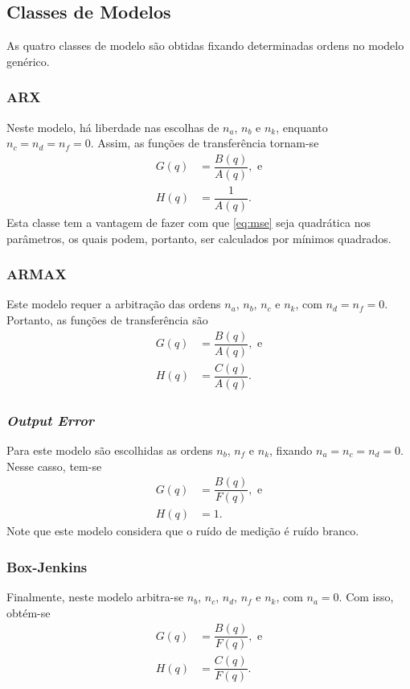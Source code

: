 \documentclass{ppgeesa}
\begin{document}
\subsection{Classes de Modelos}
As quatro classes de modelo são obtidas fixando determinadas ordens no modelo genérico.

\subsubsection{ARX}
Neste modelo, há liberdade nas escolhas de $n_a$, $n_b$ e $n_k$, enquanto $n_c = n_d = n_f = 0$.
Assim, as funções de transferência tornam-se
\begin{align}
  G(q) &= \dfrac{B(q)}{A(q)}
  , \text{ e}
  \\
  H(q) &= \dfrac{1}{A(q)}
  .
\end{align}
Esta classe tem a vantagem de fazer com que \eqref{eq:mse} seja quadrática nos parâmetros, os quais podem, portanto, ser calculados por mínimos quadrados.

\subsubsection{ARMAX}
Este modelo requer a arbitração das ordens $n_a$, $n_b$, $n_c$ e $n_k$, com $n_d = n_f = 0$.
Portanto, as funções de transferência são
\begin{align}
  G(q) &= \dfrac{B(q)}{A(q)}
  , \text{ e}
  \\
  H(q) &= \dfrac{C(q)}{A(q)}
  .
\end{align}

\subsubsection{\emph{Output Error}}
Para este modelo são escolhidas as ordens $n_b$, $n_f$ e $n_k$, fixando $n_a = n_c = n_d = 0$.
Nesse casso, tem-se
\begin{align}
  G(q) &= \dfrac{B(q)}{F(q)}
  , \text{ e}
  \\
  H(q) &= 1
  .
\end{align}
Note que este modelo considera que o ruído de medição é ruído branco. %

\subsubsection{Box-Jenkins}
Finalmente, neste modelo arbitra-se $n_b$, $n_c$, $n_d$, $n_f$ e $n_k$, com $n_a = 0$.
Com isso, obtém-se
\begin{align}
  G(q) &= \dfrac{B(q)}{F(q)}
  , \text{ e}
  \\
  H(q) &= \dfrac{C(q)}{F(q)}
  .
\end{align}
\end{document}

